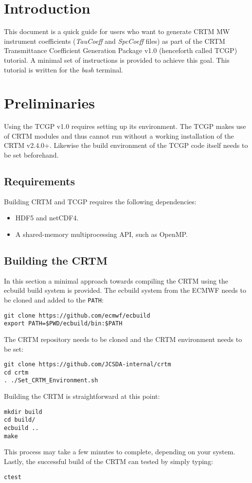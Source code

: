 \section{Introduction}
This document is a quick guide for users who want to generate CRTM MW instrument coefficients (\emph{TauCoeff} and \emph{SpcCoeff} files) as part of the CRTM Transmittance Coefficient Generation Package v1.0 (henceforth called TCGP) tutorial. 
A minimal set of instructions is provided to achieve this goal. This tutorial is written for the \emph{bash} terminal.

\section{Preliminaries}
Using the TCGP v1.0 requires setting up its environment. The TCGP makes use of CRTM modules and thus cannot run without a working installation of the CRTM v2.4.0+. Likewise the build environment of the TCGP code itself needs to be set beforehand.

\subsection{Requirements}
Building CRTM and TCGP requires the following dependencies:
\begin{itemize}
  \item HDF5 and netCDF4.
  \item A shared-memory multiprocessing API, such as OpenMP.
\end{itemize}

\subsection{Building the CRTM}
In this section a minimal approach towards compiling the CRTM using the ecbuild build system is provided. 
The ecbuild system from the ECMWF needs to be cloned and added to the \verb|PATH|:
\begin{verbatim}
git clone https://github.com/ecmwf/ecbuild
export PATH=$PWD/ecbuild/bin:$PATH
\end{verbatim}
The CRTM repository needs to be cloned and the CRTM environment needs to be set:
\begin{verbatim}
git clone https://github.com/JCSDA-internal/crtm
cd crtm
. ./Set_CRTM_Environment.sh
\end{verbatim}
Building the CRTM is straightforward at this point:
\begin{verbatim}
mkdir build
cd build/
ecbuild ..
make 
\end{verbatim}
This process may take a few minutes to complete, depending on your system.
Lastly, the successful build of the CRTM can tested by simply typing:
\begin{verbatim}
ctest
\end{verbatim}

